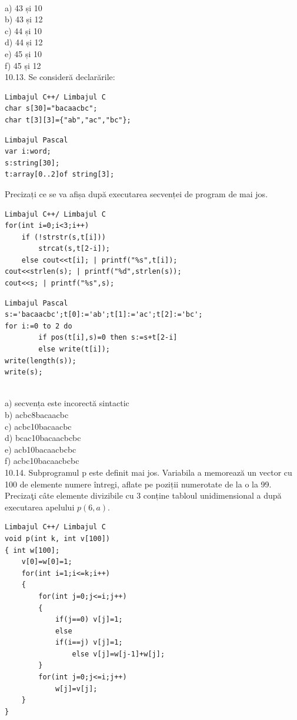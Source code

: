 \\
a) 43 și 10
\\
b) 43 și 12
\\
c) 44 și 10
\\
d) 44 și 12
\\
e) 45 și 10
\\
f) 45 și 12
\\
10.13. Se consideră declarările:
\begin{verbatim}
Limbajul C++/ Limbajul C
char s[30]="bacaacbc";
char t[3][3]={"ab","ac","bc"};
\end{verbatim}
\begin{verbatim}
Limbajul Pascal
var i:word;
s:string[30];
t:array[0..2]of string[3];
\end{verbatim}
Precizați ce se va afișa după executarea secvenței de program de mai jos.
\begin{verbatim}
Limbajul C++/ Limbajul C
for(int i=0;i<3;i++)
    if (!strstr(s,t[i]))
        strcat(s,t[2-i]);
    else cout<<t[i]; | printf("%s",t[i]);
cout<<strlen(s); | printf("%d",strlen(s));
cout<<s; | printf("%s",s);
\end{verbatim}
\begin{verbatim}
Limbajul Pascal
s:='bacaacbc';t[0]:='ab';t[1]:='ac';t[2]:='bc';
for i:=0 to 2 do
        if pos(t[i],s)=0 then s:=s+t[2-i]
        else write(t[i]);
write(length(s));
write(s);
\end{verbatim}
\\
a) secvența este incorectă sintactic
\\
b) acbc8bacaacbc
\\
c) acbc10bacaacbc
\\
d) bcac10bacaacbcbc
\\
e) acb10bacaacbcbc
\\
f) acbc10bacaacbcbc
\\
10.14. Subprogramul p este definit mai jos. Variabila a memorează un vector cu 100 de elemente numere întregi, aflate pe poziții numerotate de la o la 99. Precizaţi câte elemente divizibile cu 3 conține tabloul unidimensional a după executarea apelului $p(6, a)$.
\begin{verbatim}
Limbajul C++/ Limbajul C
void p(int k, int v[100])
{ int w[100];
    v[0]=w[0]=1;
    for(int i=1;i<=k;i++)
    {
        for(int j=0;j<=i;j++)
        {
            if(j==0) v[j]=1;
            else
            if(i==j) v[j]=1;
                else v[j]=w[j-1]+w[j];
        }
        for(int j=0;j<=i;j++)
            w[j]=v[j];
    }
}
\end{verbatim}
